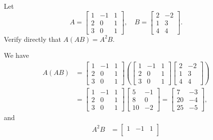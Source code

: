  Let
\begin{equation*}
  A =
  \begin{bmatrix}
    1 & -1 & 1 \\
    2 & 0 & 1 \\
    3 & 0 & 1
  \end{bmatrix},
  \quad
  B =
  \begin{bmatrix}
    2 & -2 \\
    1 & 3 \\
    4 & 4
  \end{bmatrix}.
\end{equation*}
Verify directly that $A(AB) = A^2B$.
\begin{solution}
  We have
  \begin{align*}
    A(AB)
    &=
    \begin{bmatrix}
      1 & -1 & 1 \\
      2 & 0 & 1 \\
      3 & 0 & 1
    \end{bmatrix}
    \left(
      \begin{bmatrix}
        1 & -1 & 1 \\
        2 & 0 & 1 \\
        3 & 0 & 1
      \end{bmatrix}
      \begin{bmatrix}
        2 & -2 \\
        1 & 3 \\
        4 & 4
      \end{bmatrix}
    \right) \\
    &=
    \begin{bmatrix}
      1 & -1 & 1 \\
      2 & 0 & 1 \\
      3 & 0 & 1
    \end{bmatrix}
    \begin{bmatrix}
      5 & -1 \\
      8 & 0 \\
      10 & -2
    \end{bmatrix}
    =
    \begin{bmatrix}
      7 & -3 \\
      20 & -4 \\
      25 & -5
    \end{bmatrix},
  \end{align*}
  and
  \begin{align*}
    A^2B
    &=
    \begin{bmatrix}
      1 & -1 & 1 \\

\end{bmatrix}
\end{align*}
\end{solution}

